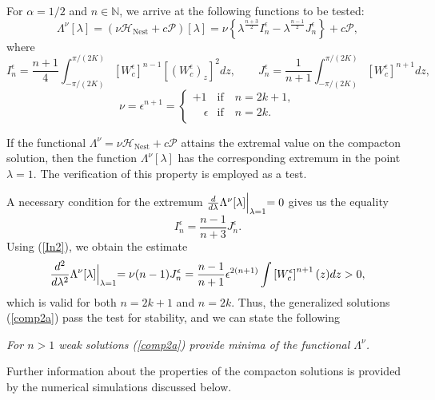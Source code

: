 \documentclass[12pt]{article}
\begin{document}
For $\alpha=1/2$ and $n\in\mathbb{N}$, we arrive at the following functions to be tested:
\begin{equation}\label{flam1Q}
\Lambda^\nu[\lambda]=(\nu \mathcal{H}_{\mathrm{Nest}} +c \mathcal{P})[\lambda]=\nu \left\{\lambda^{\frac{n+3}{2}}  I_{n}^\epsilon-\lambda^{\frac{n-1}{2}}  J_{n}^\epsilon\right\}+c \mathcal{P},
\end{equation}
where
\[
 I_{n}^\epsilon=\frac{n+1}{4}\int_{-\pi/(2 K)}^{\pi/(2 K)} \left[W_c^\epsilon\right]^{n-1} \left[\left(W_c^\epsilon\right)_z\right]^2 d z,\qquad
 J_{n}^\epsilon=\frac{1}{n+1}\int_{-\pi/(2 K)}^{\pi/(2 K)} \left[W_c^\epsilon\right]^{n+1} d z,
\]
\[
\nu=\epsilon^{n+1}=\begin{cases} +1  & \mathrm{if}\quad n=2 k+1, \\
\quad \epsilon  &  \mathrm{if}\quad n=2 k. \\
\end{cases}
\]

If the functional $\Lambda^\nu=\nu \mathcal{H}_{\mathrm{Nest}} +c \mathcal{P}$ attains the extremal value on the compacton solution, then the function $\Lambda^\nu[\lambda]$ has the corresponding extremum in the point $\lambda=1$. The verification of this property is employed as a test.


A necessary condition for the extremum
$
\frac{d}{d \lambda}\Lambda^\nu[\lambda]\Bigl|_{\lambda=1}=0
$
gives us the equality
\begin{equation}\label{In2}
 I_n^\epsilon=\frac{n-1}{n+3} J_n^\epsilon.
\end{equation}
Using (\ref{In2}), we obtain the estimate
\[
\frac{d^2}{d \lambda^2}\Lambda^\nu[\lambda]\Bigl|_{\lambda=1}=\nu (n-1) J_n^\epsilon =
\frac{n-1}{n+1} \epsilon^{2(n+1)} \int \left[W_c^\epsilon\right]^{n+1}(z) d z > 0,
\]
which is valid for both $n=2 k+1$ and $n=2 k$. Thus, the generalized solutions (\ref{comp2a})  pass the test for stability, and we can state the following

{\em For $n>1$ weak solutions (\ref{comp2a}) provide minima of the functional $\Lambda^\nu$.}

Further information about the properties of the compacton solutions is provided by the numerical simulations discussed below.
\end{document}
